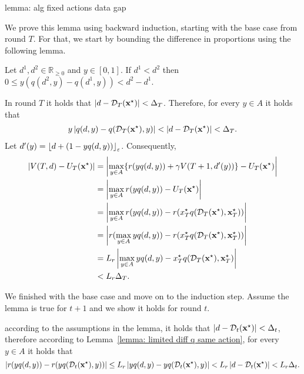 \begin{proofof}{lemma: alg fixed actions data gap}

We prove this lemma using backward induction, starting with the base case from round $T$. For that, we start by bounding the difference in proportions using the following lemma.

\begin{lemma} \label{lemma: limited diff q same action}
Let $d^1, d^2 \in \mathbb{R}_{\geq 0}$ and $y \in [0, 1]$. If $d^1 < d^2$ then $0 \leq y(q(d^2, y) - q(d^1, y)) < d^2 - d^1$.   
\end{lemma}


In round $T$ it holds that $\left| d - \mathcal{D}_T({\bf{x}}^\star)\right| < \Delta_T$. Therefore, for every $y \in A$ it holds that
\begin{align*}
y\left| q(d, y) - q(\mathcal{D}_T({\bf{x}}^\star), y) \right| < \left| d - \mathcal{D}_T({\bf{x}}^\star) \right| < \Delta_T.
\end{align*}
Let $d'(y) = {\left\lfloor d + (1-yq(d, y))\right\rfloor_{\varepsilon}}$. Consequently,
\begin{align*}
\left| V(T,d) - U_T({\bf{x}}^\star) \right| &= \left| \max_{y \in A} \{ r(y q(d, y)) + \gamma V(T+1,d'(y))\} - U_T({\bf{x}}^\star) \right| \\
&= \left| \max_{y \in A} r(y q(d, y)) - U_T({\bf{x}}^\star) \right| \\
&= \left| \max_{y \in A} r(y q(d, y)) - r(x^\star_T q(\mathcal{D}_T({\bf{x}}^\star), {\bf{x}}^\star_T)) \right| \\
&= \left| r(\max_{y \in A} y q(d, y)) - r(x^\star_T q(\mathcal{D}_T({\bf{x}}^\star), {\bf{x}}^\star_T)) \right| \\
&= L_r \left| \max_{y \in A} y q(d, y) - x^\star_T q(\mathcal{D}_T({\bf{x}}^\star), {\bf{x}}^\star_T) \right| \\
&< L_r \Delta_T.
\end{align*}

We finished with the base case and move on to the induction step. Assume the lemma is true for $t + 1$ and we show it holds for round $t$.

according to the assumptions in the lemma, it holds that $\left| d - \mathcal{D}_t({\bf{x}}^\star)\right| < \Delta_t$, therefore according to Lemma~\ref{lemma: limited diff q same action}, for every $y \in A$ it holds that
\[
 \left| r(yq(d, y)) - r(yq(\mathcal{D}_t({\bf{x}}^\star), y)) \right| \leq L_r \left| yq(d, y) - yq(\mathcal{D}_t({\bf{x}}^\star), y) \right|  < L_r \left| d - \mathcal{D}_t({\bf{x}}^\star) \right| < L_r \Delta_t.
\]


\end{proofof}

